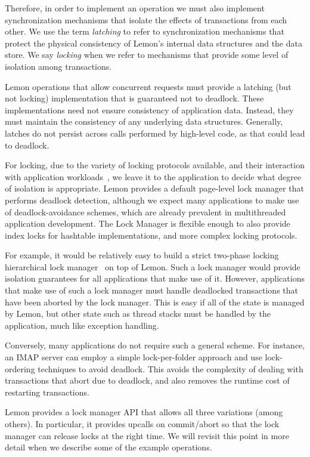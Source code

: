 \documentclass[letterpaper,twocolumn,english]{article}
\newcommand{\yad}{Lemon\xspace}
\begin{document}
Therefore, in order to implement an operation we must also implement
synchronization mechanisms that isolate the effects of transactions
from each other.  We use the term {\em latching} to refer to
synchronization mechanisms that protect the physical consistency of
\yad's internal data structures and the data store.  We say {\em
locking} when we refer to mechanisms that provide some level of
isolation among transactions.  

\yad operations that allow concurrent requests must provide a latching
(but not locking) implementation that is guaranteed not to deadlock.
These implementations need not ensure consistency of application data.
Instead, they must maintain the consistency of any underlying data
structures.  Generally, latches do not persist across calls performed
by high-level code, as that could lead to deadlock.

For locking, due to the variety of locking protocols available, and
their interaction with application
workloads~\cite{multipleGenericLocking}, we leave it to the
application to decide what degree of isolation is appropriate.  \yad
provides a default page-level lock manager that performs deadlock
detection, although we expect many applications to make use of
deadlock-avoidance schemes, which are already prevalent in
multithreaded application development.  The Lock Manager is flexible
enough to also provide index locks for hashtable implementations, and more complex locking protocols.

For example, it would be relatively easy to build a strict two-phase
locking hierarchical lock
manager~\cite{hierarcicalLocking,hierarchicalLockingOnAriesExample} on
top of \yad.  Such a lock manager would provide isolation guarantees
for all applications that make use of it.  However, applications that
make use of such a lock manager must handle deadlocked transactions
that have been aborted by the lock manager.  This is easy if all of
the state is managed by \yad, but other state such as thread stacks
must be handled by the application, much like exception handling.

Conversely, many applications do not require such a general scheme.
For instance, an IMAP server can employ a simple lock-per-folder
approach and use lock-ordering techniques to avoid deadlock.  This
avoids the complexity of dealing with transactions that abort due
to deadlock, and also removes the runtime cost of restarting 
transactions.

\yad provides a lock manager API that allows all three variations
(among others). In particular, it provides upcalls on commit/abort so
that the lock manager can release locks at the right time. We will
revisit this point in more detail when we describe some of the example
operations.
\end{document}
